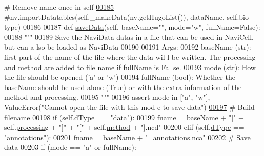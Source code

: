 \begin{DoxyCode}
      \textcolor{comment}{# Remove name once in self}
\hypertarget{navidata_8py_source_l00185}{}\hyperlink{classnavicom_1_1navidata_1_1NaviData_a485fbc0ffff49b94f3736b2a0f8cb54e}{00185}         \textcolor{comment}{#nv.importDatatables(self.\_makeData(nv.getHugoList()), dataName, self.bio
      type)}
00186 
00187     \textcolor{keyword}{def }\hyperlink{classnavicom_1_1navidata_1_1NaviData_a3dfc92056e5fc254e80607cef39234bf}{saveData}(self, baseName="", mode="w", fullName=False):
00188         \textcolor{stringliteral}{"""}
00189 \textcolor{stringliteral}{        Save the NaviData datas in a file that can be used in NaviCell, but can a
      lso be loaded as NaviData}
00190 \textcolor{stringliteral}{}
00191 \textcolor{stringliteral}{        Args:}
00192 \textcolor{stringliteral}{            baseName (str): first part of the name of the file where the data wil
      l be written. The processing and method are added to file name if fullName is Fal
      se.}
00193 \textcolor{stringliteral}{            mode (str): How the file should be opened ('a' or 'w')}
00194 \textcolor{stringliteral}{            fullName (bool): Whether the baseName should be used alone (True) or 
      with the extra information of the method and processing.}
00195 \textcolor{stringliteral}{        """}
00196         \textcolor{keyword}{assert} mode \textcolor{keywordflow}{in} [\textcolor{stringliteral}{"a"}, \textcolor{stringliteral}{"w"}], ValueError(\textcolor{stringliteral}{"Cannot open the file with this mod
      e to save data"})
\hypertarget{navidata_8py_source_l00197}{}\hyperlink{classnavicom_1_1navidata_1_1NaviData_a3dfc92056e5fc254e80607cef39234bf}{00197}         \textcolor{comment}{# Build filename}
00198         \textcolor{keywordflow}{if} (self.\hyperlink{classnavicom_1_1navidata_1_1NaviData_a89cf0727f26dba8aabb38271d85b169d}{dType} == \textcolor{stringliteral}{"data"}):
00199             fname = baseName + \textcolor{stringliteral}{"["} + self.\hyperlink{classnavicom_1_1navidata_1_1NaviData_ab3f30d76377459fe539f440df162ea59}{processing} + \textcolor{stringliteral}{"]"} + \textcolor{stringliteral}{"["} + self.\hyperlink{classnavicom_1_1navidata_1_1NaviData_ae8f909ed788b49a3c894251957e2f732}{method} + 
      \textcolor{stringliteral}{"].ncd"}
00200         \textcolor{keywordflow}{elif} (self.\hyperlink{classnavicom_1_1navidata_1_1NaviData_a89cf0727f26dba8aabb38271d85b169d}{dType} == \textcolor{stringliteral}{"annotations"}):
00201             fname = baseName + \textcolor{stringliteral}{"\_annotations.nca"}
00202         \textcolor{comment}{# Save data}
00203         \textcolor{keywordflow}{if} (mode == \textcolor{stringliteral}{"a"} \textcolor{keywordflow}{or} fullName):

\end{DoxyCode}

